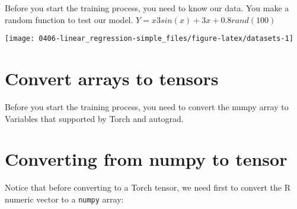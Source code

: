 \documentclass[]{book}
\newenvironment{Shaded}{\begin{snugshade}}{\end{snugshade}}
\newcommand{\FloatTok}[1]{\textcolor[rgb]{0.00,0.00,0.81}{#1}}
\newcommand{\KeywordTok}[1]{\textcolor[rgb]{0.13,0.29,0.53}{\textbf{#1}}}
\newcommand{\NormalTok}[1]{#1}
\newcommand{\OperatorTok}[1]{\textcolor[rgb]{0.81,0.36,0.00}{\textbf{#1}}}
\newcommand{\StringTok}[1]{\textcolor[rgb]{0.31,0.60,0.02}{#1}}
\begin{document}
Before you start the training process, you need to know our data. You make a random function to test our model. \(Y = x3 sin(x)+ 3x+0.8 rand(100)\)

\begin{Shaded}
\end{Shaded}

\begin{center}\texttt{[image: 0406-linear\_regression-simple\_files/figure-latex/datasets-1]} \end{center}

\hypertarget{convert-arrays-to-tensors}{%
\section{Convert arrays to tensors}\label{convert-arrays-to-tensors}}

Before you start the training process, you need to convert the numpy array to Variables that supported by Torch and autograd.

\hypertarget{converting-from-numpy-to-tensor}{%
\section{Converting from numpy to tensor}\label{converting-from-numpy-to-tensor}}

Notice that before converting to a Torch tensor, we need first to convert the R numeric vector to a \texttt{numpy} array:
\end{document}
